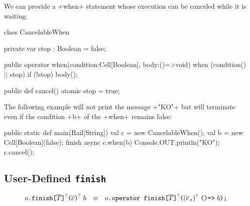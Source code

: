 \begin{ex}
  We can provide a \xcd+when+ statement whose execution can be
  canceled while it is waiting:
\begin{xten}
class CancelableWhen {
  private var stop : Boolean = false;

  public operator when(condition:Cell[Boolean], body:()=>void) {
    when (condition() || stop) {
      if (!stop) { body(); }
    }
  }

  public def cancel() {
    atomic { stop = true; }
  }
}
\end{xten}
%
The following example will not print the message \xcd+"KO"+ but will
terminate even if the condition \xcd+b+ of the \xcd+when+ remains
false:
\begin{xten}
public static def main(Rail[String]) {
  val c = new CancelableWhen();
  val b = new Cell[Boolean](false);
  finish {
    async {
      c.when(b) { Console.OUT.println("KO"); }
    }
    c.cancel();
  }
}
\end{xten}
\end{ex}

\subsection{User-Defined \texttt{finish}}

$$
\begin{array}{rcl}
    {o}\texttt{.finish}\texttt{[}{\overline{T}}\texttt{]}^?\texttt{(}{\overline{e}}\texttt{)}^?~{b}
    & \equiv &
    {o}\texttt{.operator~finish}\texttt{[}{\overline{T}}\texttt{]}^?\texttt{(} ({\overline{e}}\texttt{,})^?~ \texttt{()=>}~{b}\texttt{);}
\end{array}
$$

